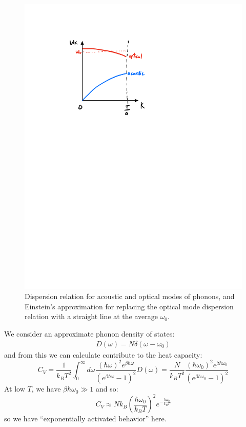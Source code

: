 \begin{figure}[htbp]
    \centering
    \includegraphics[scale=0.7]{Images/fig-einsteinmodelapprox.pdf}

    \caption{Dispersion relation for acoustic and optical modes of phonons, and Einstein's approximation for replacing the optical mode dispersion relation with a straight line at the average $\omega_0$.}
    \label{fig-einsteinmodelapprox}
\end{figure}


We consider an approximate phonon density of states:
\begin{align*}
    D(\omega) = N\delta(\omega - \omega_0)
\end{align*}
and from this we can calculate contribute to the heat capacity:
\begin{equation}
    C_V = \frac{1}{k_B T^2}\int_0^\infty d\omega\frac{(\hbar\omega)^2 e^{\beta\hbar\omega}}{(e^{\beta\hbar\omega} - 1)^2}D(\omega) = \frac{N}{k_BT^2}\frac{(\hbar\omega_0)^2 e^{\beta\hbar\omega_0}}{(e^{\beta\hbar\omega_0} - 1)^2}
\end{equation}
At low $T$, we have $\beta\hbar\omega_0 \gg 1$ and so:
\begin{equation}
    C_V \approx N k_B\left(\frac{\hbar\omega_0}{k_B T}\right)^2 e^{-\frac{\hbar\omega_0}{k_B T}}
\end{equation}
so we have ``exponentially activated behavior'' here.

